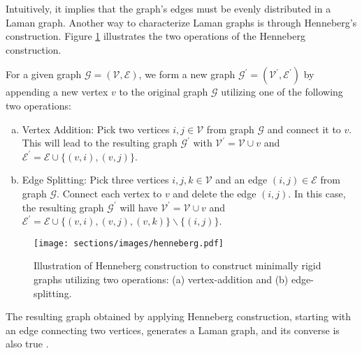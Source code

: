 Intuitively, it implies that the graph's edges must be evenly distributed in a Laman graph. Another way to characterize Laman graphs is through Henneberg's construction. Figure \ref{fig:henneberg} illustrates the two operations of the Henneberg construction. 
\begin{definition}
For a given graph $\mathcal{G} = (\mathcal{V}, \mathcal{E})$, we form a new graph $\mathcal{G^{'}} = (\mathcal{V}^{'}, \mathcal{E}^{'})$ by appending a new vertex $v$ to the original graph $\mathcal{G}$ utilizing one of the following two operations:
\begin{enumerate}[(a)]
    \item Vertex Addition: Pick two vertices $i,j\in\mathcal{V}$ from graph $\mathcal{G}$ and connect it to $v$. This will lead to the resulting graph $\mathcal{G}^{'}$ with $\mathcal{V}^{'}= \mathcal{V} \cup v$ and $\mathcal{E}^{'} = \mathcal{E}\cup\{(v, i),(v, j)\}$. %
    \item Edge Splitting: Pick three vertices $i,j, k\in\mathcal{V}$ and an edge $(i,j) \in \mathcal{E}$ from graph $\mathcal{G}$. Connect each vertex to $v$ and delete the edge $(i,j)$. In this case, the resulting graph $\mathcal{G}^{'}$ will have $\mathcal{V}^{'} = \mathcal{V} \cup v$ and $\mathcal{E}^{'} = \mathcal{E}\cup\{(v, i),(v, j), (v, k)\} \backslash \{ (i,j)\}$. %
\end{enumerate}
\end{definition}
\begin{figure}[h]
\centering
\texttt{[image: sections/images/henneberg.pdf]}
\caption{Illustration of Henneberg construction to construct minimally rigid graphs utilizing two operations: (a) vertex-addition and (b) edge-splitting.}
\label{fig:henneberg}
\end{figure} 
The resulting graph obtained by applying Henneberg construction, starting with an edge connecting two vertices, generates a Laman graph, and its converse is also true \cite{zhao2017laman}.
